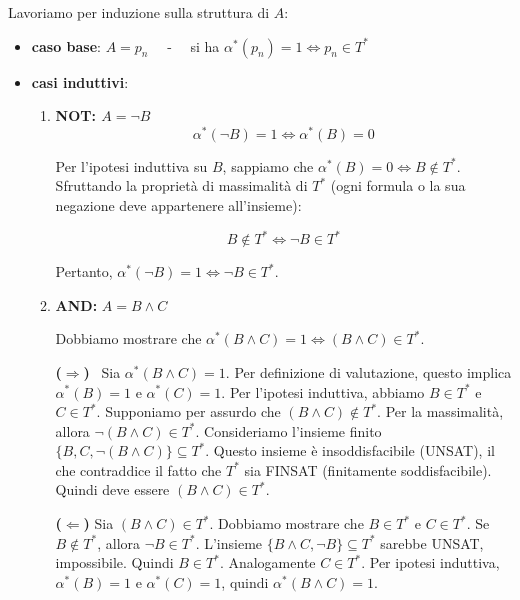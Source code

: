 \documentclass[a4paper,11pt]{report}
\begin{document}
Lavoriamo per induzione sulla struttura di \( A \):
\begin{itemize}
    \item \textbf{caso base}: \( A = p_n \) \ \ - \ \ si ha \( \alpha^*(p_n) = 1 \iff p_n \in T^* \)
    \item \textbf{casi induttivi}:
        \begin{enumerate}
            \item \textbf{NOT: \( A = \neg B \)}
\[
\alpha^*(\neg B) = 1 \iff \alpha^*(B) = 0
\]

Per l'ipotesi induttiva su \( B \), sappiamo che \( \alpha^*(B) = 0 \iff B \notin T^* \).
Sfruttando la proprietà di massimalità di \( T^* \) {\color{gray}\small(ogni formula o la sua negazione deve appartenere all'insieme)}:


\[
B \notin T^* \iff \neg B \in T^*
\]

Pertanto, \( \alpha^*(\neg B) = 1 \iff \neg B \in T^* \).


                \subitem 
            \item \textbf{AND: } \( A = B \land C \)


\vspace{0.5em}
Dobbiamo mostrare che \( \alpha^*(B \land C) = 1 \iff (B \wedge C) \in T^* \).
\vspace{0.5em}

\subitem \textbf{(\(\Rightarrow\))} \ Sia \( \alpha^*(B \land C) = 1 \).
Per definizione di valutazione, questo implica \( \alpha^*(B) = 1 \) e \( \alpha^*(C) = 1 \).
Per l'ipotesi induttiva, abbiamo \( B \in T^* \) e \( C \in T^* \).
Supponiamo per assurdo che \( (B \land C) \notin T^* \). Per la massimalità, allora \( \neg(B \wedge C) \in T^* \).
Consideriamo l'insieme finito \( \{B, C, \neg(B \land C)\} \subseteq T^* \). Questo insieme è insoddisfacibile (UNSAT), il che contraddice il fatto che \( T^* \) sia FINSAT (finitamente soddisfacibile).
Quindi deve essere \( (B \land C) \in T^* \).

\vspace{0.5em}

\subitem 
\textbf{(\(\Leftarrow\))} Sia \( (B \land C) \in T^* \).
Dobbiamo mostrare che \( B \in T^* \) e \( C \in T^* \).
Se \( B \notin T^* \), allora \( \neg B \in T^* \). L'insieme \( \{B \land C, \neg B\} \subseteq T^* \) sarebbe UNSAT, impossibile. Quindi \( B \in T^* \). Analogamente \( C \in T^* \).
Per ipotesi induttiva, \( \alpha^*(B)=1 \) e \( \alpha^*(C)=1 \), quindi \( \alpha^*(B \land C) = 1 \).

\subitem


\end{enumerate}
\end{itemize}
\end{document}

